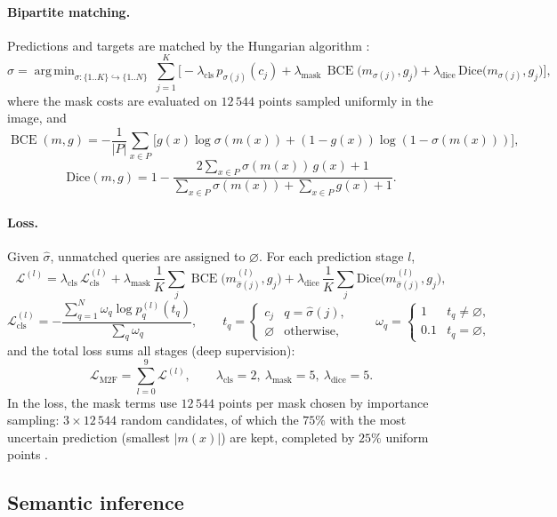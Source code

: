 \documentclass[11pt,a4paper]{article}
\newcommand{\1}{\mathbb{1}}
\newcommand{\sg}{\sigma}
\newcommand{\nulc}{\varnothing}
\DeclareMathOperator*{\argmin}{arg\,min}
\DeclareMathOperator{\BCE}{BCE}
\begin{document}
\paragraph{Bipartite matching.} Predictions and targets are matched by the
Hungarian algorithm \cite{kuhn1955}:
\[
\hat\sigma = \argmin_{\sigma:\{1..K\}\hookrightarrow\{1..N\}}\
\sum_{j=1}^{K}
\Big[-\lambda_{\text{cls}}\, p_{\sigma(j)}(c_j)
+ \lambda_{\text{mask}}\,\BCE\big(m_{\sigma(j)}, g_j\big)
+ \lambda_{\text{dice}}\,\mathrm{Dice}\big(m_{\sigma(j)}, g_j\big)\Big],
\]
where the mask costs are evaluated on $12\,544$ points sampled uniformly in
the image, and
\[
\BCE(m,g) = -\frac1{|P|}\sum_{x\in P}\big[g(x)\log\sg(m(x)) + (1-g(x))\log(1-\sg(m(x)))\big],
\]
\[
\mathrm{Dice}(m,g) = 1 - \frac{2\sum_{x\in P}\sg(m(x))\,g(x) + 1}
                          {\sum_{x\in P}\sg(m(x)) + \sum_{x\in P}g(x) + 1}.
\]

\paragraph{Loss.} Given $\hat\sigma$, unmatched queries are assigned to
$\nulc$. For each prediction stage $l$,
\[
\mathcal{L}^{(l)} =
\lambda_{\text{cls}}\,\mathcal{L}_{\text{cls}}^{(l)}
+ \lambda_{\text{mask}}\,\frac1K\sum_{j}\BCE\big(m^{(l)}_{\hat\sigma(j)}, g_j\big)
+ \lambda_{\text{dice}}\,\frac1K\sum_{j}\mathrm{Dice}\big(m^{(l)}_{\hat\sigma(j)}, g_j\big),
\]
\[
\mathcal{L}_{\text{cls}}^{(l)} = -\frac{\sum_{q=1}^{N}\omega_q\log p^{(l)}_q(t_q)}{\sum_q\omega_q},
\qquad
t_q =
\begin{cases}
c_j & q=\hat\sigma(j),\\
\nulc & \text{otherwise},
\end{cases}
\qquad
\omega_q =
\begin{cases}
1 & t_q\ne\nulc,\\
0.1 & t_q=\nulc,
\end{cases}
\]
and the total loss sums all stages (deep supervision):
\[
\mathcal{L}_{\text{M2F}} = \sum_{l=0}^{9}\mathcal{L}^{(l)},
\qquad
\lambda_{\text{cls}}=2,\ \lambda_{\text{mask}}=5,\ \lambda_{\text{dice}}=5 .
\]
In the loss, the mask terms use $12\,544$ points per mask chosen by
importance sampling: $3\times12\,544$ random candidates, of which the $75\%$
with the most uncertain prediction (smallest $|m(x)|$) are kept, completed by
$25\%$ uniform points \cite{cheng2022}.

\subsection{Semantic inference}
\end{document}
